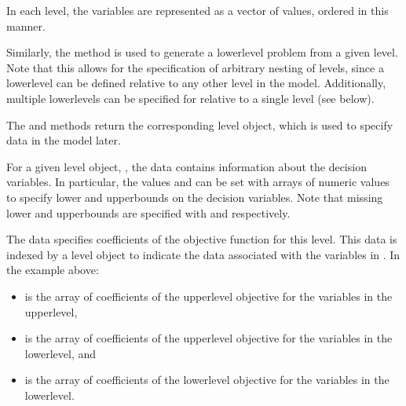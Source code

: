 \documentclass[letterpaper,10pt,english]{sphinxmanual}
\begin{document}
In each level, the variables are represented as a vector of values,
ordered in this manner.

Similarly, the  method is used to generate a lower\sphinxhyphen{}level
problem from a given level.  Note that this allows for the specification
of arbitrary nesting of levels, since a lower\sphinxhyphen{}level can be defined
relative to any other level in the model.  Additionally, multiple
lower\sphinxhyphen{}levels can be specified for relative to a single level (see below).

The  and  methods return the
corresponding level object, which is used to specify data in the model
later.

For a given level object, , the data  contains
information about the decision variables.  In particular, the values
 and  can be set with arrays
of numeric values to specify lower\sphinxhyphen{} and upper\sphinxhyphen{}bounds on the decision
variables.  Note that missing lower\sphinxhyphen{} and upper\sphinxhyphen{}bounds are specified with
 and  respectively.

The  data specifies coefficients of the objective function for
this level.  This data is indexed by a level object  to indicate
the data associated with the variables in .  In the example above:
\begin{itemize}
\item {} 
 is the array of coefficients of the upper\sphinxhyphen{}level objective for the variables in the upper\sphinxhyphen{}level,

\item {} 
 is the array of coefficients of the upper\sphinxhyphen{}level objective for the variables in the lower\sphinxhyphen{}level, and

\item {} 
 is the array of coefficients of the lower\sphinxhyphen{}level objective for the variables in the lower\sphinxhyphen{}level.

\end{itemize}
\end{document}

